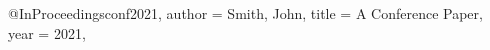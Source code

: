 @InProceedings{conf2021,
  author = {Smith, John},
  title = {A Conference Paper},
  year = {2021},
}
